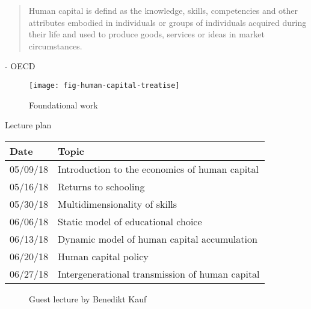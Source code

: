 \begin{frame}
    \begin{quote}
Human capital is defind as
the knowledge, skills, competencies and other attributes embodied in individuals or groups of individuals acquired during their life and used to produce goods, services or ideas in market circumstances.
\end{quote}\vspace{-0.5pt} \hspace{6cm} - OECD
\end{frame}

\begin{frame}
	\begin{figure}
		\caption{Foundational work}
		\centering\texttt{[image: fig-human-capital-treatise]}
	\end{figure}
\end{frame}


\begin{frame}
\centering
\begin{threeparttable}\footnotesize
  \caption{Lecture plan}
  \begin{tabular}{ll}\toprule
  Date & Topic \\\midrule
05/09/18 & Introduction to the economics of human capital\\
05/16/18 & Returns to schooling \\
05/30/18 & Multidimensionality of skills \\
06/06/18 & Static model of educational choice \\
06/13/18 & Dynamic model of human capital accumulation \\
06/20/18 & Human capital policy \\
06/27/18 & Intergenerational transmission of human capital\\
\bottomrule
\end{tabular}
\end{threeparttable}
\end{frame}

\begin{frame}
	\begin{figure}
		\caption{Guest lecture by Benedikt Kauf}
		\centering{}
	\end{figure}
\end{frame}

